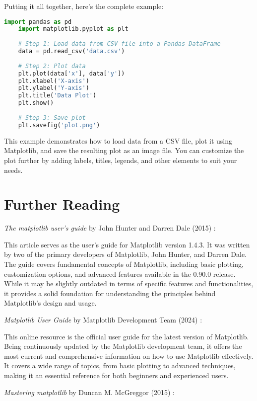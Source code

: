 Putting it all together, here's the complete example:

\begin{lstlisting}[language=Python, caption=Complete Example]
	import pandas as pd
	import matplotlib.pyplot as plt
	
	# Step 1: Load data from CSV file into a Pandas DataFrame
	data = pd.read_csv('data.csv')
	
	# Step 2: Plot data
	plt.plot(data['x'], data['y'])
	plt.xlabel('X-axis')
	plt.ylabel('Y-axis')
	plt.title('Data Plot')
	plt.show()
	
	# Step 3: Save plot
	plt.savefig('plot.png')
\end{lstlisting}

This example demonstrates how to load data from a CSV file, plot it using Matplotlib, and save the resulting plot as an image file. You can customize the plot further by adding labels, titles, legends, and other elements to suit your needs.


\section{Further Reading}


\textit{The matplotlib user’s guide} by John Hunter and Darren Dale (2015) \cite{Hunter:2015}:

This article serves as the user's guide for Matplotlib version 1.4.3. It was written by two of the primary developers of Matplotlib, John Hunter, and Darren Dale. The guide covers fundamental concepts of Matplotlib, including basic plotting, customization options, and advanced features available in the 0.90.0 release. While it may be slightly outdated in terms of specific features and functionalities, it provides a solid foundation for understanding the principles behind Matplotlib's design and usage.


\textit{Matplotlib User Guide} by Matplotlib Development Team (2024) \cite{Matplotlib:2024}:

This online resource is the official user guide for the latest version of Matplotlib. Being continuously updated by the Matplotlib development team, it offers the most current and comprehensive information on how to use Matplotlib effectively. It covers a wide range of topics, from basic plotting to advanced techniques, making it an essential reference for both beginners and experienced users.

\textit{Mastering matplotlib} by Duncan M. McGreggor (2015) \cite{Mcgreggor:2015}:

